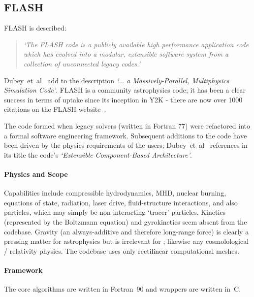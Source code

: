 \subsection{FLASH}\label{sec:flash}


FLASH \cite{flashwebsite} is described:
\begin{quote}
{\it `The FLASH code is a publicly available high performance application code 
which has evolved into a modular, extensible software system from a collection 
of unconnected legacy codes.'}
\end{quote}

Dubey~et~al~\cite{Du09Exte} add to the description {\it `... a Massively-Parallel,
Multiphysics Simulation Code'}.  FLASH is a community astrophysics code; it has been a clear 
success in terms of uptake since its inception in Y2K - there are now over 1000 
citations on the FLASH website~\cite{flashwebsite}.


The code formed when legacy solvers (written in Fortran 77) were refactored 
into a formal software engineering framework.  Subsequent additions to the code 
have been driven by the physics requirements of the users; Dubey~et~al~\cite{Du09Exte} 
references in its title the code's {\it `Extensible Component-Based 
Architecture'}.

\paragraph{Physics and Scope}

Capabilities include compressible hydrodynamics, MHD, nuclear burning, 
equations of state, radiation, laser drive, fluid-structure interactions, and 
also particles, which may simply be non-interacting `tracer' particles.
Kinetics (represented by the Boltzmann equation) and 
gyrokinetics seem absent from the codebase.  Gravity (an always-additive and 
therefore long-range force) is clearly a pressing matter for astrophysics but 
is irrelevant for \nep; likewise any cosmolological / relativity physics. 
The codebase uses only rectilinear computational meshes.


\paragraph{Framework} 

The core algorithms are written in Fortran~90 and wrappers are written in~C.

